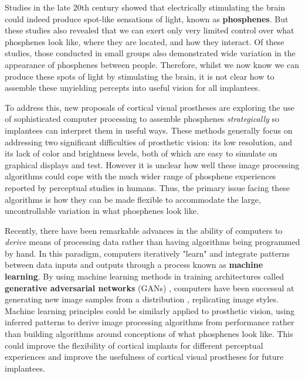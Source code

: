 \documentclass[a4paper,11pt,openany]{book}
\begin{document}
Studies in the late 20th century showed that electrically stimulating the brain could indeed produce spot-like sensations of light, known as \textbf{phosphenes}. \cite{brindley_sensations_1968,dobelle_phosphenes_1974,bak_visual_1990,bosking_electrical_2017}
But these studies also revealed that we can exert only very limited control over what phosphenes look like, where they are located, and how they interact. \cite{rushton_properties_1978,dobelle_phosphenes_1974,schmidt_feasibility_1996}
Of these studies, those conducted in small groups also demonstrated wide variation in the appearance of phosphenes between people. \cite{dobelle_phosphenes_1974,bak_visual_1990}
Therefore, whilst we now know we can produce these spots of light by stimulating the brain, it is not clear how to assemble these unyielding percepts into useful vision for all implantees. \cite{fernandez_development_2005,beyeler_learning_2017}

To address this, new proposals of cortical visual prostheses are exploring the use of sophisticated computer processing to assemble phosphenes \emph{strategically} so implantees can interpret them in useful ways. \cite{foroushani_cortical_2018,barnes_role_2012}
These methods generally focus on addressing two significant difficulties of prosthetic vision: its low resolution, and its lack of color and brightness levels, both of which are easy to simulate on graphical displays and test.  \cite{buffoni_image_2005,chang_facial_2012,sharmili_comparative_2017}
However it is unclear how well these image processing algorithms could cope with the much wider range of phosphene experiences reported by perceptual studies in humans.
Thus, the primary issue facing these algorithms is how they can be made flexible to accommodate the large, uncontrollable variation in what phosphenes look like.

Recently, there have been remarkable advances in the ability of computers to \emph{derive} means of processing data rather than having algorithms being programmed by hand.
In this paradigm, computers iteratively "learn" and integrate patterns between data inputs and outputs through a process known as \textbf{machine learning}.  \cite{guo_deep_2016}
By using machine learning methods in training architectures called \textbf{generative adversarial networks} (GANs) , computers have been successul at generating new image samples from a distribution \cite{NIPS2014_54230}, replicating image styles. \cite{gatys_image_2016}
Machine learning principles could be similarly applied to prosthetic vision, using inferred patterns to derive image processing algorithms from performance rather than building algorithms around conceptions of what phosphenes look like.
This could improve the flexibility of cortical implants for different perceptual experiences and improve the usefulness of cortical visual prostheses for future implantees.
\end{document}
